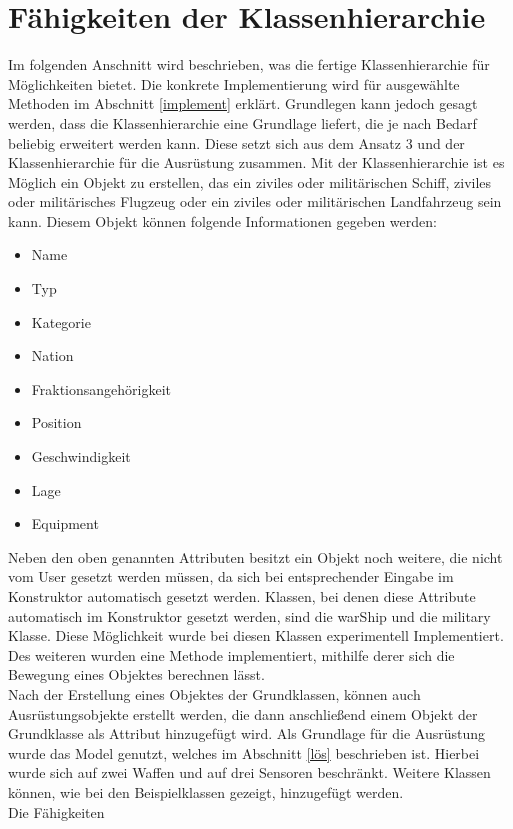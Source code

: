 \section{Fähigkeiten der Klassenhierarchie}
Im folgenden Anschnitt wird beschrieben, was die fertige Klassenhierarchie für Möglichkeiten bietet. Die konkrete Implementierung wird für ausgewählte Methoden im Abschnitt \ref{implement} erklärt.
Grundlegen kann jedoch gesagt werden, dass die Klassenhierarchie eine Grundlage liefert, die je nach Bedarf beliebig erweitert werden kann.
Diese setzt sich aus dem Ansatz 3 und der Klassenhierarchie für die Ausrüstung zusammen. 
Mit der Klassenhierarchie ist es Möglich ein Objekt zu erstellen, das ein ziviles oder militärischen Schiff, ziviles oder militärisches Flugzeug oder ein ziviles oder militärischen Landfahrzeug sein kann. Diesem Objekt können folgende Informationen gegeben werden:
\begin{itemize}
	\singlespacing
	\item Name
	\item Typ
	\item Kategorie
	\item Nation
	\item Fraktionsangehörigkeit
	\item Position
	\item Geschwindigkeit
	\item Lage
	\item Equipment
\end{itemize}
Neben den oben genannten Attributen besitzt ein Objekt noch weitere, die nicht vom User gesetzt werden müssen, da sich bei entsprechender Eingabe im Konstruktor automatisch gesetzt werden. Klassen, bei denen diese Attribute automatisch im Konstruktor gesetzt werden, sind die \glqq warShip\grqq{} und die \glqq military\grqq{} Klasse. Diese Möglichkeit wurde bei diesen Klassen experimentell Implementiert.
Des weiteren wurden eine Methode implementiert, mithilfe derer sich die Bewegung eines Objektes berechnen lässt. \\
Nach der Erstellung eines Objektes der Grundklassen, können auch Ausrüstungsobjekte erstellt werden, die dann anschließend einem Objekt der Grundklasse als Attribut hinzugefügt wird. Als Grundlage für die Ausrüstung wurde das Model genutzt, welches im Abschnitt \ref{lös} beschrieben ist. Hierbei wurde sich auf zwei Waffen und auf drei Sensoren beschränkt. Weitere Klassen können, wie bei den Beispielklassen gezeigt, hinzugefügt werden. \\
Die Fähigkeiten 


